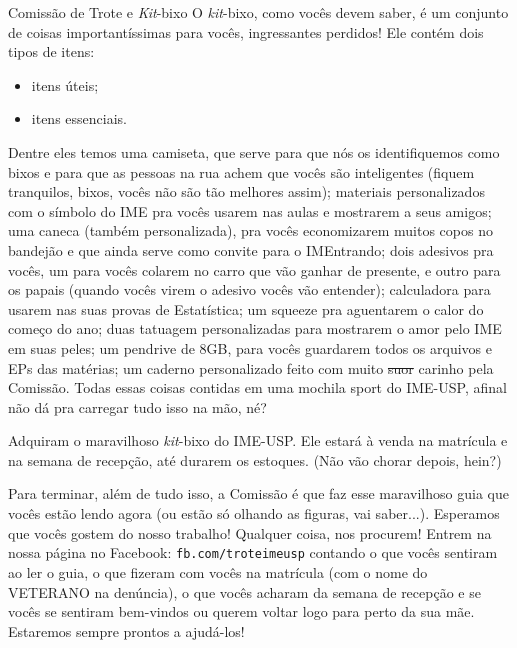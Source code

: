 \begin{secao}{Comissão de Trote e \textit{Kit}-bixo}
O \textit{kit}-bixo, como vocês devem saber, é um conjunto de coisas
importantíssimas para vocês, ingressantes perdidos! Ele contém dois tipos de
itens:
\begin{itemize}
\item itens úteis;
\item itens essenciais.
\end{itemize} %
Dentre eles temos uma camiseta, que serve para que nós os identifiquemos como
bixos e para que as pessoas na rua achem que vocês são inteligentes (fiquem
tranquilos, bixos, vocês não são tão melhores assim); materiais personalizados
com o símbolo do IME pra vocês usarem nas aulas e mostrarem a seus amigos; uma
caneca (também personalizada), pra vocês economizarem muitos copos no bandejão e
que ainda serve como convite para o IMEntrando; dois adesivos pra vocês, um para
vocês colarem no carro que vão ganhar de presente, e outro para os papais
(quando vocês virem o adesivo vocês vão entender); calculadora para usarem nas
suas provas de Estatística; um squeeze pra aguentarem o calor do começo do ano;
duas tatuagem personalizadas para mostrarem o amor pelo IME em suas peles; um
pendrive de 8GB, para vocês guardarem todos os arquivos e EPs das matérias; um
caderno personalizado feito com muito \sout{suor} carinho pela Comissão. Todas
essas coisas contidas em uma mochila sport do IME-USP, afinal não dá pra
carregar tudo isso na mão, né?

Adquiram o maravilhoso \textit{kit}-bixo do IME-USP. Ele estará à venda na
matrícula e na semana de recepção, até durarem os estoques. (Não vão chorar
depois, hein?)

Para terminar, além de tudo isso, a Comissão é que faz esse maravilhoso guia que
vocês estão lendo agora (ou estão só olhando as figuras, vai
saber...). Esperamos que vocês gostem do nosso trabalho! Qualquer coisa, nos
procurem! Entrem na nossa página no Facebook: {\tt fb.com/troteimeusp} contando o
que vocês sentiram ao ler o guia, o que fizeram com vocês na matrícula (com o
nome do VETERANO na denúncia), o que vocês acharam da semana de recepção e se
vocês se sentiram bem-vindos ou querem voltar logo para perto da sua
mãe. Estaremos sempre prontos a ajudá-los!
\end{secao}
